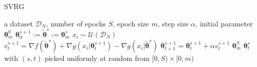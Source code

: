\documentclass{article}
\theoremstyle{remark}
\theoremstyle{definition}
\newcommand{\vtheta}{\boldsymbol{\theta}}
\newcommand{\wt}[1]{\widetilde{#1}}
\begin{document}
\begin{algorithm}[tb]
	\caption{SVRG}
	\label{alg:svrg}
	\begin{algorithmic}
             a dataset $\mathcal{D}_N$, number of epochs $S$, epoch size $m$, step size $\alpha$, initial parameter $\vtheta_{m}^0$
		\STATE $\vtheta_0^{s+1} := \wt{\vtheta}^s := \vtheta_{m}^s$
        \STATE $x_i \sim \mathcal{U}\left(\mathcal{D}_N\right)$
		\STATE $v^{s+1}_t = 
			\nabla f(\wt{\vtheta}^s) + 
			\nabla g(x_i|\vtheta_t^{s+1}) -
			\nabla g(x_i|\wt{\vtheta}^{s})
		$
        \STATE $\vtheta_{t+1}^{s+1} = \vtheta_t^{s+1} + \alpha v^{s+1}_t$
		\ENDFOR
		\ENDFOR
		 $\vtheta_{m}^S$
		 $\vtheta_t^s$ with $(s,t)$ picked uniformly at random from $[0,S)\times[0,m)$
	\end{algorithmic}
\end{algorithm}
\end{document}
